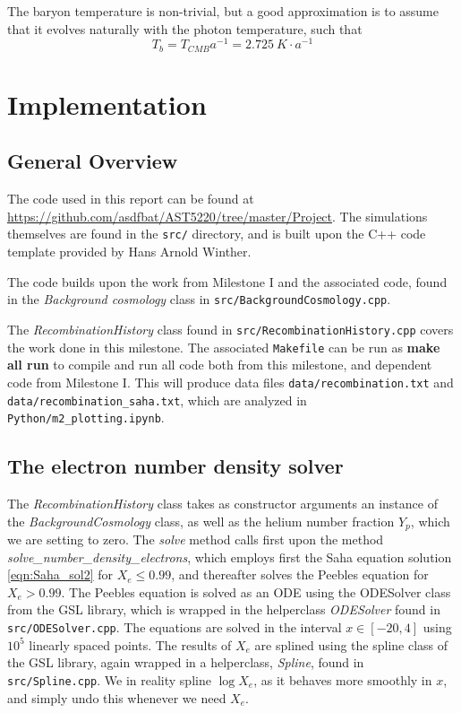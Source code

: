 \documentclass[10pt, a4paper]{article}
\begin{document}
The baryon temperature is non-trivial, but a good approximation \cite{Euler} is to assume that it evolves naturally with the photon temperature, such that
\begin{equation*}
    T_{b} = T_{CMB}a^{-1} = \SI{2.725}{K}\cdot a^{-1}
\end{equation*}


\section{Implementation}
\subsection{General Overview}
The code used in this report can be found at \url{https://github.com/asdfbat/AST5220/tree/master/Project}. The simulations themselves are found in the \texttt{src/} directory, and is built upon the C++ code template provided by Hans Arnold Winther.

The code builds upon the work from Milestone I \cite{Milestone1} and the associated code, found in the \textit{Background cosmology} class in \texttt{src/BackgroundCosmology.cpp}.

The \textit{RecombinationHistory} class found in \texttt{src/RecombinationHistory.cpp} covers the work done in this milestone. The associated \texttt{Makefile} can be run as \textbf{make all run} to compile and run all code both from this milestone, and dependent code from Milestone I. This will produce data files \texttt{data/recombination.txt} and \texttt{data/recombination\_saha.txt}, which are analyzed in \texttt{Python/m2\_plotting.ipynb}.

\subsection{The electron number density solver}
The \textit{RecombinationHistory} class takes as constructor arguments an instance of the \textit{BackgroundCosmology} class, as well as the helium number fraction $Y_p$, which we are setting to zero. The \textit{solve} method calls first upon the method \textit{solve\_number\_density\_electrons}, which employs first the Saha equation solution \ref{eqn:Saha_sol2} for $X_e \leq 0.99$, and thereafter solves the Peebles equation for $X_e > 0.99$. The Peebles equation is solved as an ODE using the ODESolver class from the GSL library, which is wrapped in the helperclass \textit{ODESolver} found in \texttt{src/ODESolver.cpp}. The equations are solved in the interval $x\in [-20, 4]$ using $10^5$ linearly spaced points. The results of $X_e$ are splined using the spline class of the GSL library, again wrapped in a helperclass, \textit{Spline}, found in \texttt{src/Spline.cpp}. We in reality spline $\log{X_e}$, as it behaves more smoothly in $x$, and simply undo this whenever we need $X_e$.
\end{document}

